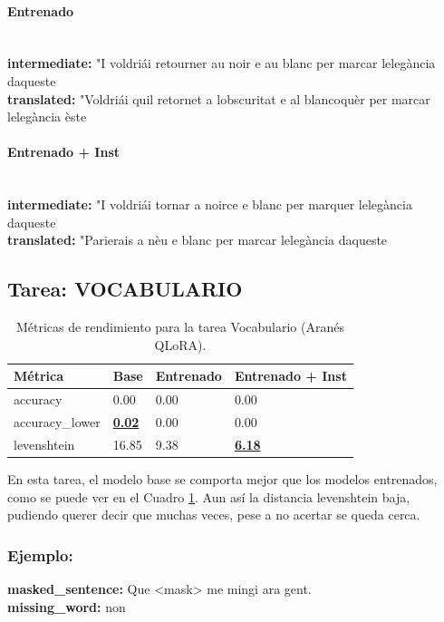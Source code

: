 \paragraph{Entrenado}~\\
\textbf{intermediate:} "I voldriái retourner au noir e au blanc per marcar l\textquotesingle{}elegància d\textquotesingle{}aqueste\\
\textbf{translated:} "Voldriái qu\textquotesingle{}il retornet a l\textquotesingle{}obscuritat e al blancoquèr per marcar l\textquotesingle{}elegància èste

\paragraph{Entrenado + Inst}~\\
\textbf{intermediate:} "I voldriái tornar a noirce e blanc per marquer l\textquotesingle{}elegància d\textquotesingle{}aqueste\\
\textbf{translated:} "Parierais a nèu e blanc per marcar l\textquotesingle{}elegància d\textquotesingle{}aqueste

\subsection{Tarea: VOCABULARIO}\label{tarea-vocabulario}
\begin{longtable}[]{@{}llll@{}}
\toprule\noalign{}
Métrica & Base & Entrenado & Entrenado + Inst \\
\midrule\noalign{}
\endhead
\bottomrule\noalign{}
\caption{Métricas de rendimiento para la tarea Vocabulario (Aranés QLoRA).}
\label{tab:metricas_vocabulario_Aranés QLoRA}
\endlastfoot
accuracy & 0.00 & 0.00 & 0.00 \\
accuracy\_lower & \textbf{\underline{0.02}} & 0.00 & 0.00 \\
levenshtein & 16.85 & 9.38 & \textbf{\underline{6.18}} \\
\end{longtable}

En esta tarea, el modelo base se comporta mejor que los modelos entrenados, como se puede ver en el Cuadro \ref{tab:metricas_vocabulario_Aranés QLoRA}. Aun así la distancia levenshtein baja, pudiendo querer decir que muchas veces, pese a no acertar se queda cerca. 

\subsubsection{Ejemplo:}
\textbf{masked\_sentence:} Que {\textless}mask{\textgreater} me mingi ara gent.\\
\textbf{missing\_word:} non

